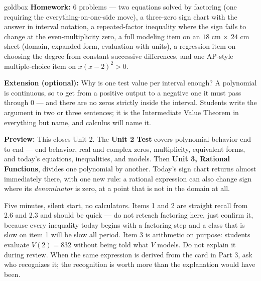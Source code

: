 \documentclass[10pt]{article}
\begin{document}
\begin{skillbox}{goldbox}
\textbf{Homework:} 6 problems --- two equations solved by factoring (one
requiring the everything-on-one-side move), a three-zero sign chart with the
answer in interval notation, a repeated-factor inequality where the sign fails
to change at the even-multiplicity zero, a full modeling item on an $18$ cm
$\times$ $24$ cm sheet (domain, expanded form, evaluation with units), a
regression item on choosing the degree from constant successive differences,
and one AP-style multiple-choice item on $x(x-2)^2 > 0$.

\textbf{Extension (optional):} Why is one test value per interval enough? A
polynomial is continuous, so to get from a positive output to a negative one
it must pass through $0$ --- and there are no zeros strictly inside the
interval. Students write the argument in two or three sentences; it is the
Intermediate Value Theorem in everything but name, and calculus will name it.

\textbf{Preview:} This closes Unit 2. The \textbf{Unit 2 Test} covers
polynomial behavior end to end --- end behavior, real and complex zeros,
multiplicity, equivalent forms, and today's equations, inequalities, and
models. Then \textbf{Unit 3, Rational Functions}, divides one polynomial by
another. Today's sign chart returns almost immediately there, with one new
rule: a rational expression can also change sign where its \textit{denominator}
is zero, at a point that is not in the domain at all.
\end{skillbox}

\begin{teachernote}[Warm-Up]
Five minutes, silent start, no calculators. Items 1 and 2 are straight recall
from 2.6 and 2.3 and should be quick --- do not reteach factoring here, just
confirm it, because every inequality today begins with a factoring step and a
class that is slow on item 1 will be slow all period. Item 3 is arithmetic on
purpose: students evaluate $V(2) = 832$ without being told what $V$ models.
Do not explain it during review. When the same expression is derived from the
card in Part 3, ask who recognizes it; the recognition is worth more than the
explanation would have been.
\end{teachernote}
\end{document}
